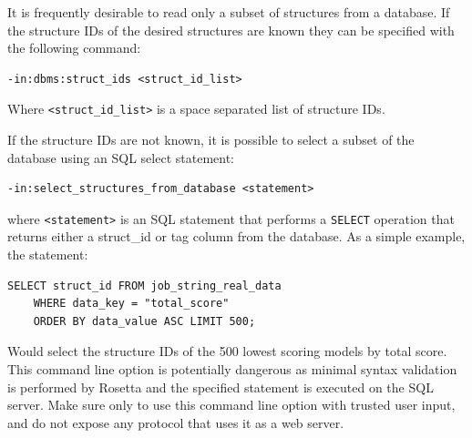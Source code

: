 It is frequently desirable to read only a subset of structures from a database. 
If the structure IDs of the desired structures are known they can be specified with the following command:

\singlespace
\begin{Verbatim}
-in:dbms:struct_ids <struct_id_list>
\end{Verbatim}
\doublespace

Where \texttt{<struct\_id\_list>} is a space separated list of structure IDs.

If the structure IDs are not known, it is possible to select a subset of the database using an \ac{SQL} select statement:

\singlespace
\begin{Verbatim}
-in:select_structures_from_database <statement>
\end{Verbatim}
\doublespace

where \texttt{<statement>} is an SQL statement that performs a \texttt{SELECT} operation that returns either a struct\_id or tag column from the database.  As a simple example, the statement:

\singlespace
\begin{Verbatim}
SELECT struct_id FROM job_string_real_data 
	WHERE data_key = "total_score" 
	ORDER BY data_value ASC LIMIT 500;
\end{Verbatim}
\doublespace

Would select the structure IDs of the 500 lowest scoring models by total score.
This command line option is potentially dangerous as minimal syntax validation is performed by Rosetta and the specified statement is executed on the \ac{SQL} server.
Make sure only to use this command line option with trusted user input, and do not expose any protocol that uses it as a web server.